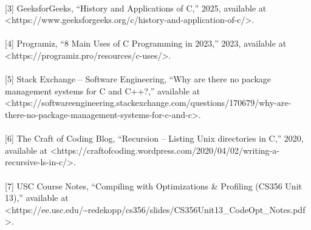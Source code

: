 \documentclass{article}
\begin{document}
\\
{\normalsize [3] }{\normalsize GeeksforGeeks}{\normalsize , “History and Applications of C,” 2025, available at <https://www.geeksforgeeks.org/c/history-and-appl}{\normalsize ication-of-c/>.}\\
\\
{\normalsize [4] }{\normalsize Programiz}{\normalsize , “8 Main Uses of C Programming in 2023,” 2023, available at <https://programiz.pro/resources/c-uses/>.}\\
\\
{\normalsize [5] Stack Exchange – Software Engineering, “Why are there no package management systems for C and }{\normalsize C++?,}{\normalsize ” available at <ht}{\normalsize tps://softwareengineering.stackexchange.com/questions/170679/why-are-there-no-package-management-systems-for-c-and-c>.}\\
\\
{\normalsize [6] The Craft of Coding Blog, “Recursion – Listing Unix directories in C,” 2020, available at <https://craftofcoding.wordpress.com/2020/}{\normalsize 04/02/writing-a-recursive-ls-in-c/>.}\\
\\
{\normalsize [7] USC Course Notes, “Compiling with Optimizations \& Profiling (CS356 Unit 13),” available at <https://ee.usc.edu/\textasciitilde{}redekopp/cs356/slides/CS356Unit13\_CodeOpt\_Notes.pdf>.}\\
\end{document}
